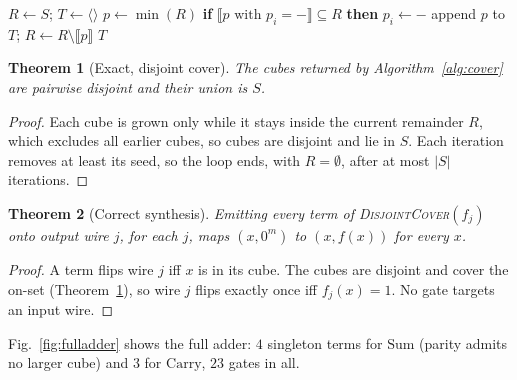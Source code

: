 \documentclass[conference]{IEEEtran}
\newcommand{\Algo}[1]{\textup{\textsc{#1}}}
\theoremstyle{plain}
\newtheorem{theorem}{Theorem}
\begin{document}
\begin{algorithm}[t]
\caption{\Algo{DisjointCover}$(S)$}
\label{alg:cover}
\begin{algorithmic}[1]
\State $R \gets S$; $T\gets\langle\rangle$
  \State $p \gets \min(R)$
  \Comment{\Algo{GrowCube}}
    \State \textbf{if} $\llbracket p \text{ with } p_i{=}{-}\rrbracket \subseteq R$ \textbf{then} $p_i \gets -$
  \EndFor
  \State append $p$ to $T$; $R \gets R\setminus\llbracket p\rrbracket$
\EndWhile
\State \Return $T$
\end{algorithmic}
\end{algorithm}

\begin{theorem}[Exact, disjoint cover]
\label{thm:exactness}
The cubes returned by Algorithm~\ref{alg:cover} are pairwise disjoint and
their union is $S$.
\end{theorem}
\begin{proof}
Each cube is grown only while it stays inside the current remainder $R$,
which excludes all earlier cubes, so cubes are disjoint and lie in $S$.
Each iteration removes at least its seed, so the loop ends, with $R=\emptyset$,
after at most $|S|$ iterations.
\end{proof}

\begin{theorem}[Correct synthesis]
\label{thm:correctness}
Emitting every term of \Algo{DisjointCover}$(f_j)$ onto output wire
$j$, for each $j$, maps $(x,0^m)$ to $(x,f(x))$ for every $x$.
\end{theorem}
\begin{proof}
A term flips wire $j$ iff $x$ is in its cube. The cubes are disjoint and
cover the on-set (Theorem~\ref{thm:exactness}), so wire $j$ flips exactly
once iff $f_j(x)=1$. No gate targets an input wire.
\end{proof}

Fig.~\ref{fig:fulladder} shows the full adder: $4$ singleton terms for
$\mathrm{Sum}$ (parity admits no larger cube) and $3$ for
$\mathrm{Carry}$, $23$ gates in all.
\end{document}
